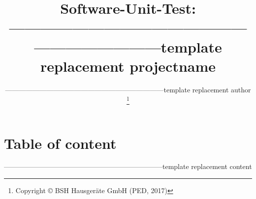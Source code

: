 \documentclass[a4paper,twoside,12pt]{scrartcl}
\newcommand\project         {
---------------------------------------------------------------------template replacement projectname
}
\newcommand\reportauthor    {
---------------------------------------------------------------------template replacement author
}
\begin{document}
\normalfont
\rmfamily
\mdseries
\normalsize
\selectfont
\title{ Software-Unit-Test:\\\project}
\author{ \reportauthor
\thanks{Copyright \copyright \hspace{0.5cm} BSH Hausgeräte GmbH (PED, 2017) \hfill}}
\maketitle


\newpage 
\section{Table of content}
\tableofcontents


---------------------------------------------------------------------template replacement content
\end{document}

